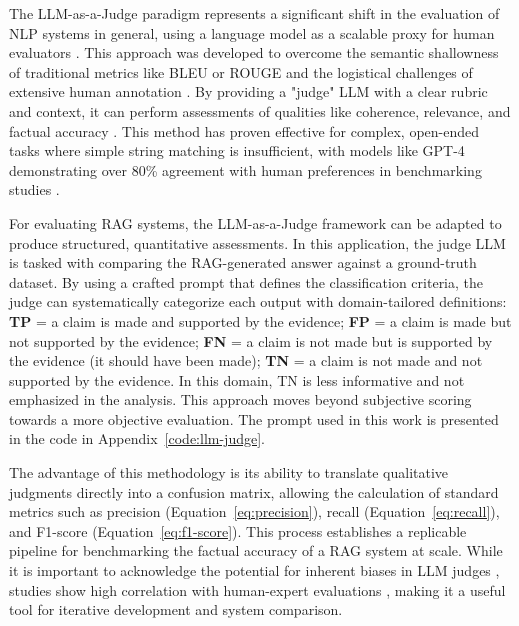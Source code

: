             The LLM-as-a-Judge paradigm represents a significant shift in the evaluation of NLP systems in general, using a language model as a scalable proxy for human evaluators \citep{li2024llmsasjudgescomprehensivesurveyllmbased}. 
            This approach was developed to overcome the semantic shallowness of traditional metrics like BLEU or ROUGE and the logistical challenges of extensive human annotation \citep{Zheng2023}. 
            By providing a "judge" LLM with a clear rubric and context, it can perform assessments of qualities like coherence, relevance, and factual accuracy \citep{li2024llmsasjudgescomprehensivesurveyllmbased}. 
            This method has proven effective for complex, open-ended tasks where simple string matching is insufficient, with models like GPT-4 demonstrating over 80\% agreement with human preferences in benchmarking studies \citep{Zheng2023}.

            For evaluating RAG systems, the LLM-as-a-Judge framework can be adapted to produce structured, quantitative assessments. 
            In this application, the judge LLM is tasked with comparing the RAG-generated answer against a ground-truth dataset.
            By using a crafted prompt that defines the classification criteria, the judge can systematically categorize each output with domain-tailored definitions: \textbf{TP} = a claim is made and supported by the evidence; \textbf{FP} = a claim is made but not supported by the evidence; \textbf{FN} = a claim is not made but is supported by the evidence (it should have been made); \textbf{TN} = a claim is not made and not supported by the evidence. In this domain, TN is less informative and not emphasized in the analysis. This approach moves beyond subjective scoring towards a more objective evaluation. The prompt used in this work is presented in the code in Appendix~\ref{code:llm-judge}.

            The advantage of this methodology is its ability to translate qualitative judgments directly into a confusion matrix, allowing the calculation of standard metrics such as precision (Equation~\ref{eq:precision}), recall (Equation~\ref{eq:recall}), and F1-score (Equation~\ref{eq:f1-score}). This process establishes a replicable pipeline for benchmarking the factual accuracy of a RAG system at scale. While it is important to acknowledge the potential for inherent biases in LLM judges \citep{Gu2025}, studies show high correlation with human-expert evaluations \citep{li2024llmsasjudgescomprehensivesurveyllmbased}, making it a useful tool for iterative development and system comparison.
